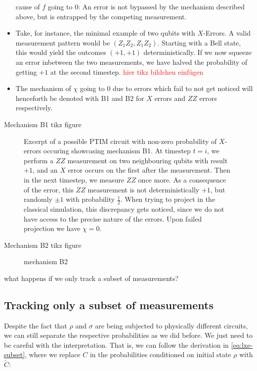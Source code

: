 \begin{itemize}
    cause of $f$ going to $0$: An error is not bypassed by the mechanism
    described above, but is entrapped by the competing measurement.
  \item Take, for instance, the minimal example of two qubits with $X$-Errors.
    A valid measurement pattern would be $(Z_1Z_2, Z_1Z_2)$. Starting with a
    Bell state, this would yield the outcomes $(+1, +1)$ deterministically. If
    we now squeeze an error inbetween the two measurements, we have halved the
    probability of getting $+1$ at the second timestep. \textcolor{red}{hier
    tikz bildchen einf\"ugen}
    \item The mechanism of $\chi$ going to $0$ due to errors which fail to not 
    get noticed will henceforth be denoted with \textsf{B1} and \textsf{B2} for
    $X$ errors and $ZZ$ errors respectively.
\end{itemize}

Mechanism \textsf{B1} tikz figure
\begin{figure}[h]
  \centering
  
  \caption{Excerpt of a possible PTIM circuit with non-zero probability of
  $X$-errors occuring showcasing mechanism \textsf{B1}. At timestep $t=i$, 
  we perform a $ZZ$ measurement on two neighbouring qubits with result $+1$,
  and an $X$ error occurs on the first after the measurement. Then in the next
  timestep, we measure $ZZ$ once more. As a consequence of the error, this $ZZ$
  measurement is not deterministically $+1$, but randomly $\pm 1$ with
  probability $\frac{1}{2}$. When trying to project in the classical
  simulation, this discrepancy gets noticed, since we do not have access to the
  precise nature of the errors. Upon failed projection we have $\chi=0$.}
  \label{fig:mech-b1-lxe}
\end{figure}

Mechanism \textsf{B2} tikz figure
\begin{figure}[h]
  \centering
  
  \caption{mechanism \textsf{B2}}
  \label{fig:mech-b2-lxe}
\end{figure}


what happens if we only track a subset of measurements?
\subsection{Tracking only a subset of measurements}
\label{sec:lxe-err-subset}
Despite the fact that $\rho$ and $\sigma$ are being subjected to physically
different circuits, we can still separate the respective probabilities as we
did before. We just need to be careful with the interpretation. That is, we can
follow the derivation in \cref{eq:lxe-subset}, where we replace $C$ in the
probabilities conditioned on initial state $\rho$ with $\tilde{C}$:

